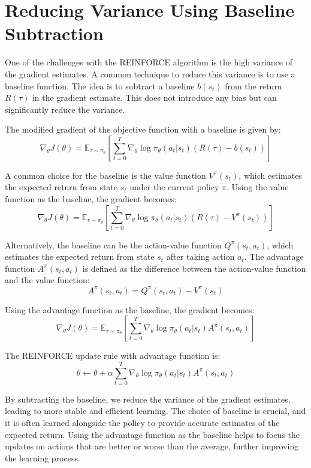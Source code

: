 \documentclass[12pt]{article}
\begin{document}
\section{Reducing Variance Using Baseline Subtraction}

One of the challenges with the REINFORCE algorithm is the high variance of the gradient estimates. A common technique to reduce this variance is to use a baseline function. The idea is to subtract a baseline \( b(s_t) \) from the return \( R(\tau) \) in the gradient estimate. This does not introduce any bias but can significantly reduce the variance.

The modified gradient of the objective function with a baseline is given by:
\[ 
\nabla_\theta J(\theta) = \mathbb{E}_{\tau \sim \pi_\theta} \left[ \sum_{t=0}^{T} \nabla_\theta \log \pi_\theta(a_t | s_t) (R(\tau) - b(s_t)) \right] 
\]

A common choice for the baseline is the value function \( V^\pi(s_t) \), which estimates the expected return from state \( s_t \) under the current policy \( \pi \). Using the value function as the baseline, the gradient becomes:
\[ 
\nabla_\theta J(\theta) = \mathbb{E}_{\tau \sim \pi_\theta} \left[ \sum_{t=0}^{T} \nabla_\theta \log \pi_\theta(a_t | s_t) (R(\tau) - V^\pi(s_t)) \right] 
\]

Alternatively, the baseline can be the action-value function \( Q^\pi(s_t, a_t) \), which estimates the expected return from state \( s_t \) after taking action \( a_t \). The advantage function \( A^\pi(s_t, a_t) \) is defined as the difference between the action-value function and the value function:
\[ 
A^\pi(s_t, a_t) = Q^\pi(s_t, a_t) - V^\pi(s_t) 
\]

Using the advantage function as the baseline, the gradient becomes:
\[ 
\nabla_\theta J(\theta) = \mathbb{E}_{\tau \sim \pi_\theta} \left[ \sum_{t=0}^{T} \nabla_\theta \log \pi_\theta(a_t | s_t) A^\pi(s_t, a_t) \right] 
\]

The REINFORCE update rule with advantage function is:
\[ 
\theta \leftarrow \theta + \alpha \sum_{t=0}^{T} \nabla_\theta \log \pi_\theta(a_t | s_t) A^\pi(s_t, a_t) 
\]

By subtracting the baseline, we reduce the variance of the gradient estimates, leading to more stable and efficient learning. The choice of baseline is crucial, and it is often learned alongside the policy to provide accurate estimates of the expected return. Using the advantage function as the baseline helps to focus the updates on actions that are better or worse than the average, further improving the learning process.
\end{document}
